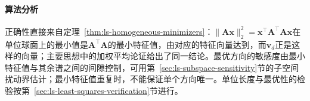 \paragraph{算法分析}
正确性直接来自定理~\ref{thm:ls-homogeneous-minimizers}：$\lVert\bm A\bm x\rVert_2^2=\bm x^\top\bm A^\top\bm A\bm x$在单位球面上的最小值是$\bm A^\top\bm A$的最小特征值，由对应的特征向量达到，而$\bm v_d$正是这样的向量；主要思想中的加权平均论证给出了同一结论。最优方向的敏感度由最小特征值与其余谱之间的间隙控制，可用第~\ref{sec:ls-subspace-sensitivity}节的子空间扰动界估计；最小特征值重复时，不能保证单个方向唯一。单位长度与最优性的检验按第~\ref{sec:ls-least-squares-verification}节进行。
